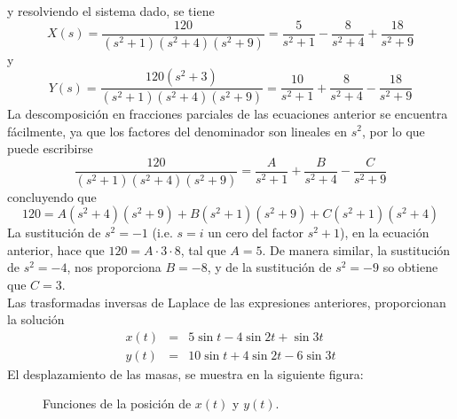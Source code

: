 y resolviendo el sistema dado, se tiene
\[ X(s) = \dfrac{120}{(s^{2} + 1)(s^{2} + 4)(s^{2} + 9)} = \dfrac{5}{s^{2} + 1} - \dfrac{8}{s^{2} + 4} + \dfrac{18}{s^{2} + 9} \]
y 
\[ Y(s) = \dfrac{120 (s^{2} + 3)}{(s^{2} + 1)(s^{2} + 4)(s^{2} + 9)} = \dfrac{10}{s^{2} + 1} + \dfrac{8}{s^{2} + 4} - \dfrac{18}{s^{2} + 9} \]
La descomposición en fracciones parciales de las ecuaciones anterior se encuentra fácilmente, ya que los factores del denominador son lineales en $s^{2}$, por lo que puede escribirse
\[ \dfrac{120}{(s^{2} + 1)(s^{2} + 4)(s^{2} + 9)} = \dfrac{A}{s^{2} + 1} + \dfrac{B}{s^{2} + 4} - \dfrac{C}{s^{2} + 9} \]
concluyendo que
\[ 120 =  A(s^{2}+4)(s^{2}+9) + B(s^{2}+1)(s^{2}+9) + C(s^{2}+1)(s^{2}+4) \]
La sustitución de $s^{2}=-1$ (i.e. $s=i$ un cero del factor $s^{2}+1$), en la ecuación anterior, hace que $120= A \cdot 3 \cdot 8$, tal que $A=5$. De manera similar, la sustitución de $s^{2} = -4$, nos proporciona $B=-8$, y de la sustitución de $s^{2}= -9$ so obtiene que $C=3$.
\\
Las trasformadas inversas de Laplace de las expresiones anteriores, proporcionan la solución
\begin{eqnarray*}
x(t) &=& 5 \sin t - 4 \sin 2t + \sin 3t \nonumber \\
y(t) &=& 10 \sin t + 4 \sin 2t - 6 \sin 3t \nonumber
\end{eqnarray*}
El desplazamiento de las masas, se muestra en la siguiente figura:
\begin{figure}[H]
\centering

\label{fig:figura_006}
\caption{Funciones de la posición de $x(t)$ y $y(t)$.}
\end{figure}
